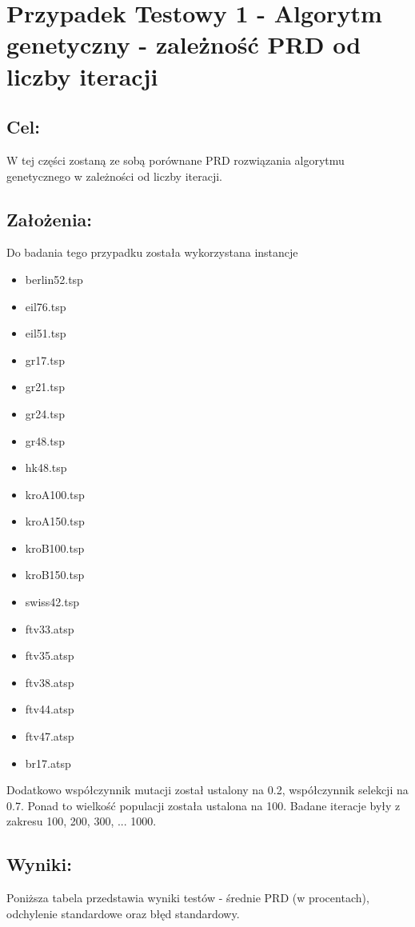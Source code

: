 \section{Przypadek Testowy 1 - Algorytm genetyczny - zależność PRD od liczby iteracji}
  \subsection{Cel:}
    W tej części zostaną ze sobą porównane PRD rozwiązania algorytmu genetycznego w zależności od liczby iteracji.
    \subsection{Założenia:}
    Do badania tego przypadku została wykorzystana instancje 
    \begin{itemize}
      \item berlin52.tsp
      \item eil76.tsp
      \item eil51.tsp
      \item gr17.tsp
      \item gr21.tsp
      \item gr24.tsp
      \item gr48.tsp
      \item hk48.tsp
      \item kroA100.tsp
      \item kroA150.tsp
      \item kroB100.tsp
      \item kroB150.tsp
      \item swiss42.tsp
      \item ftv33.atsp
      \item ftv35.atsp
      \item ftv38.atsp
      \item ftv44.atsp
      \item ftv47.atsp
      \item br17.atsp
    \end{itemize}
    Dodatkowo współczynnik mutacji został ustalony na 0.2, współczynnik selekcji na 0.7. Ponad to wielkość populacji została ustalona na 100. Badane iteracje były z zakresu {100, 200, 300, ... 1000}.
  \subsection{Wyniki: }
  Poniższa tabela przedstawia wyniki testów - średnie PRD (w procentach), odchylenie standardowe oraz błęd standardowy. 
  

